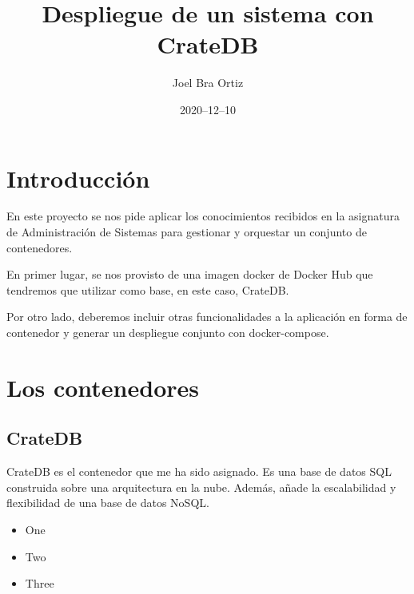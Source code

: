 \documentclass[12pt]{article}
\title{Despliegue de un sistema con CrateDB}
\author{Joel Bra Ortiz}
\date{2020–12–10}
\begin{document}
\maketitle

\section{Introducción}

En este proyecto se nos pide aplicar los conocimientos recibidos en la
asignatura de Administración de Sistemas para gestionar y orquestar un
conjunto de contenedores.

En primer lugar, se nos provisto de una imagen docker de Docker Hub que
tendremos que utilizar como base, en este caso, CrateDB\@.

Por otro lado, deberemos incluir otras funcionalidades a la aplicación en
forma de contenedor y generar un despliegue conjunto con docker-compose.

\section{Los contenedores}

\subsection[1]{CrateDB}
CrateDB es el contenedor que me ha sido asignado. Es una base de datos SQL
construida sobre una arquitectura en la nube. Además, añade la escalabilidad
y flexibilidad de una base de datos NoSQL\@.



\begin{itemize}

\item One

\item Two

\item Three

\end{itemize}
\end{document}
